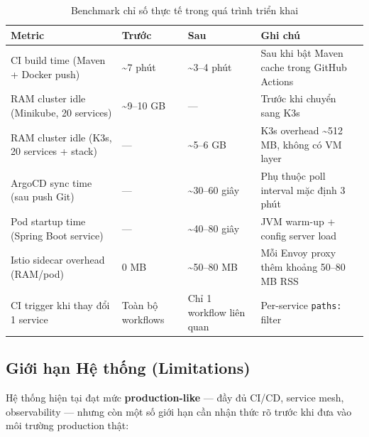 \begin{table}[H]
\centering
\renewcommand{\arraystretch}{1.4}
\begin{tabular}{|p{4.5cm}|p{3cm}|p{3cm}|p{5cm}|}
\hline
\textbf{Metric} & \textbf{Trước} & \textbf{Sau} & \textbf{Ghi chú} \\
\hline
CI build time (Maven + Docker push) & \textasciitilde{}7 phút & \textasciitilde{}3--4 phút & Sau khi bật Maven cache trong GitHub Actions \\
\hline
RAM cluster idle (Minikube, 20 services) & \textasciitilde{}9--10 GB & — & Trước khi chuyển sang K3s \\
\hline
RAM cluster idle (K3s, 20 services + stack) & — & \textasciitilde{}5--6 GB & K3s overhead \textasciitilde{}512 MB, không có VM layer \\
\hline
ArgoCD sync time (sau push Git) & — & \textasciitilde{}30--60 giây & Phụ thuộc poll interval mặc định 3 phút \\
\hline
Pod startup time (Spring Boot service) & — & \textasciitilde{}40--80 giây & JVM warm-up + config server load \\
\hline
Istio sidecar overhead (RAM/pod) & 0 MB & \textasciitilde{}50--80 MB & Mỗi Envoy proxy thêm khoảng 50--80 MB RSS \\
\hline
CI trigger khi thay đổi 1 service & Toàn bộ workflows & Chỉ 1 workflow liên quan & Per-service \texttt{paths:} filter \\
\hline
\end{tabular}
\caption{Benchmark chỉ số thực tế trong quá trình triển khai}
\label{tab:benchmarks}
\end{table}

\subsection{Giới hạn Hệ thống (Limitations)}

Hệ thống hiện tại đạt mức \textbf{production-like} --- đầy đủ CI/CD, service mesh, observability --- nhưng còn một số giới hạn cần nhận thức rõ trước khi đưa vào môi trường production thật:

